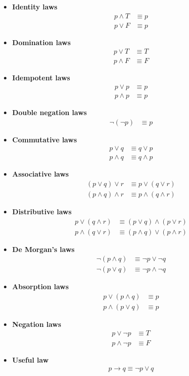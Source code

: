 \documentclass[a4paper,12pt]{article}
\begin{document}
\begin{itemize}
	\item \textbf{Identity laws} 
		\begin{align*}
			p \wedge T &\equiv p \\
			p \vee F &\equiv p
		\end{align*}
	\item \textbf{Domination laws}
		\begin{align*}
			p \vee T &\equiv T \\
			p \wedge F &\equiv F
		\end{align*}
	\item \textbf{Idempotent laws}
		\begin{align*}
			p \vee p &\equiv p \\
			p \wedge p &\equiv p
		\end{align*}
	\item \textbf{Double negation laws}
		\begin{align*}
			\neg(\neg p) &\equiv p
		\end{align*}
	\item \textbf{Commutative laws}
		\begin{align*}
			p \vee q &\equiv q \vee p \\
			p \wedge q &\equiv q \wedge p
		\end{align*}
	\item \textbf{Associative laws}
		\begin{align*}
			(p \vee q) \vee r &\equiv p \vee (q \vee r) \\
			(p \wedge q) \wedge r &\equiv p \wedge (q \wedge r)
		\end{align*}
	\item \textbf{Distributive laws}
		\begin{align*}
			p \vee (q \wedge r) &\equiv (p \vee q) \wedge (p \vee r) \\
			p \wedge (q \vee r) &\equiv (p \wedge q) \vee (p \wedge r)
		\end{align*}
	\item \textbf{De Morgan's laws}
		\begin{align*}
			\neg (p \wedge q) &\equiv \neg p \vee \neg q \\
			\neg (p \vee q) &\equiv \neg p \wedge \neg q
		\end{align*}
	\item \textbf{Absorption laws}
		\begin{align*}
			p \vee (p \wedge q) &\equiv p \\
			p \wedge (p \vee q) &\equiv p
		\end{align*}
	\item \textbf{Negation laws}
		\begin{align*}
			p \vee \neg p &\equiv T\\
			p \wedge \neg p &\equiv F
		\end{align*}
	\item \textbf{Useful law}
		\begin{align*}
			p \rightarrow q \equiv \neg p \vee q
		\end{align*}
\end{itemize}
\end{document}
